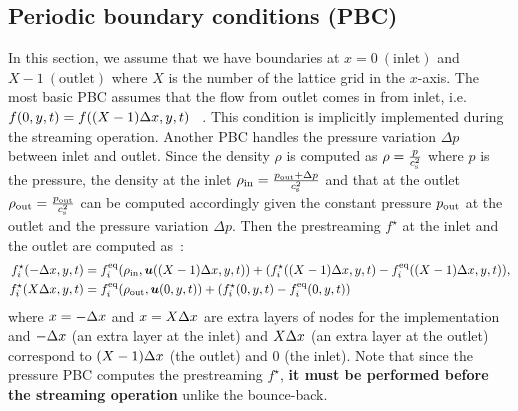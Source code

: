\subsection{Periodic boundary conditions (PBC)}
In this section, we assume that we have
boundaries at $x = 0~(\text{inlet})$ and $X - 1~(\text{outlet})$
where $X$ is the number of the lattice grid in the $x$-axis.
The most basic PBC assumes that
the flow from outlet comes in from inlet, i.e.
$f(0, y, t) = f((X - 1)\Delta x, y, t)$
~\cite{succi2018lattice}.
This condition is implicitly implemented during the streaming operation.
Another PBC handles
the pressure variation $\Delta p$ between inlet and outlet.
Since the density $\rho$ is computed as $\rho = \frac{p}{c_{\rm s}^2}$
where $p$ is the pressure,
the density at the inlet $\rho_{\rm in} = \frac{p_{\rm out} + \Delta p }{c_{\rm s}^2}$ and
that at the outlet $\rho_{\rm out} = \frac{p_{\rm out}}{c_{\rm s}^2}$ can be computed
accordingly given the constant pressure $p_{\rm out}$
at the outlet and the pressure variation $\Delta p$.
Then the prestreaming $f^\star$ at 
the inlet and the outlet are computed as~\cite{succi2018lattice}:
\begin{equation}
\begin{aligned}
  f_i^\star(-\Delta x, y, t) &=
  f_i^{\rm eq}(\rho_{\rm in}, \boldsymbol{u}((X - 1)\Delta x, y, t))
  + (f_i^\star((X - 1)\Delta x, y, t) - f_i^{\rm eq}((X - 1)\Delta x, y, t)), \\
  f_i^\star(X\Delta x, y, t) &=
  f_i^{\rm eq}(\rho_{\rm out}, \boldsymbol{u}(0, y, t))
  + (f_i^\star(0, y, t) - f_i^{\rm eq}(0, y, t))\\
\end{aligned}
\label{discretized-pbc-pressure}
\end{equation}
where $x = -\Delta x$ and $x = X\Delta x$
are extra layers of nodes for the implementation
and $-\Delta x$ (an extra layer at the inlet) and $X\Delta x$
(an extra layer at the outlet) correspond
to $(X - 1)\Delta x$ (the outlet) and $0$ (the inlet).
Note that since the pressure PBC computes the prestreaming $f^\star$,
{\bf it must be performed before the streaming operation} unlike the bounce-back.